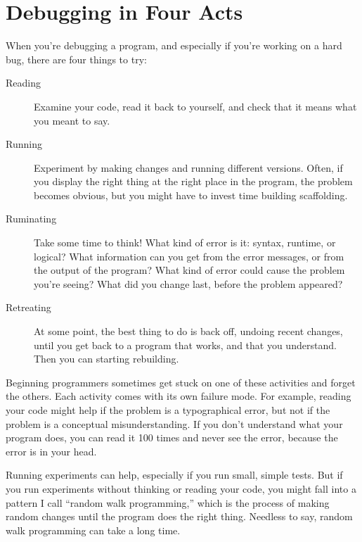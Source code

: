 \section{Debugging in Four Acts}


When you're debugging a program, and especially if you're working on a hard bug, there are four things to try:

\begin{description}

\item[Reading] Examine your code, read it back to yourself, and
check that it means what you meant to say.

\item[Running] Experiment by making changes and running different
versions.  Often, if you display the right thing at the right place
in the program, the problem becomes obvious, but you might have to invest time building scaffolding.

\item[Ruminating] Take some time to think!  What kind of error
is it: syntax, runtime, or logical?  What information can you get from
the error messages, or from the output of the program?  What kind of
error could cause the problem you're seeing?  What did you change
last, before the problem appeared?

\item[Retreating] At some point, the best thing to do is back
off, undoing recent changes, until you get back to a program that
works, and that you understand.  Then you can starting rebuilding.

\end{description}

Beginning programmers sometimes get stuck on one of these activities
and forget the others.  Each activity comes with its own failure
mode.
For example, reading your code might help if the problem is a
typographical error, but not if the problem is a conceptual
misunderstanding.  If you don't understand what your program does, you
can read it 100 times and never see the error, because the error is in
your head.

Running experiments can help, especially if you run small, simple
tests.  But if you run experiments without thinking or reading your
code, you might fall into a pattern I call ``random walk programming,''
which is the process of making random changes until the program
does the right thing.  Needless to say, random walk programming
can take a long time.


